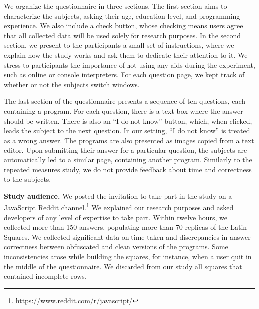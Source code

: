 We organize the questionnaire in three sections. The first section aims to characterize the subjects, asking their age, education level, and programming experience. We also include a check button, whose checking means users agree that all collected data will be used solely for research purposes. In the second section, we present to the participants a small set of instructions, where we explain how the study works and ask them to dedicate their attention to it. We stress to participants the importance of not using any aids during the experiment, such as online or console interpreters. For each question page, we kept track of whether or not the subjects switch windows. 

The last section of the questionnaire presents a sequence of ten questions, each containing a program. For each question, there is a text box where the answer should be written. There is also an ``I do not know'' button, which, when clicked, leads the subject to the next question. In our setting, ``I do not know'' is treated as a wrong answer. The programs are also presented as images copied from a text editor. Upon submitting their answer for a particular question, the subjects are automatically led to a similar page, containing another program. Similarly to the repeated measures study, we do not provide feedback about time and correctness to the subjects.




{\bf Study audience.}
We posted the invitation to take part in the study on a JavaScript Reddit channel.\footnote{https://www.reddit.com/r/javascript/} We explained our research purposes and asked developers of any level of expertise to take part. Within twelve hours, we collected more than 150 answers, populating more than 70 replicas of the Latin Squares. We collected significant data on time taken and discrepancies in answer correctness between obfuscated and clean versions of the programs. Some inconsistencies arose while building the squares, for instance, when a user quit in the middle of the questionnaire. We discarded from our study all squares that contained incomplete rows.

